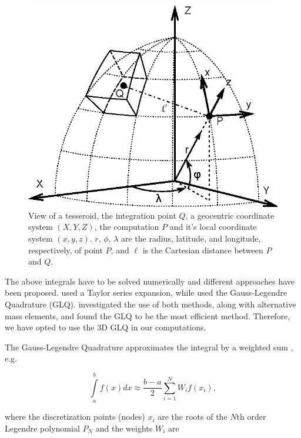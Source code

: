 \documentclass[extra]{gji}
\begin{document}
\begin{figure}
    \centering
    \includegraphics[width=\columnwidth]{figs/tesseroid}
    \caption{
        View of a tesseroid,
        the integration point $Q$,
        a geocentric coordinate system $(X, Y, Z)$,
        the computation $P$ and it's local coordinate system $(x, y, z)$.
        $r$, $\phi$, $\lambda$ are
        the radius, latitude, and longitude, respectively, of point $P$,
        and $\ell$ is the Cartesian distance between $P$ and $Q$.
    }
    \label{fig:tesseroid}
\end{figure}

The above integrals
have to be solved numerically
\citep{Wild-Pfeiffer2008}
and different approaches have been proposed.
\citet{Heck2007}
used a Taylor series expansion,
while \citet{Asgharzadeh2007}
used the Gauss-Legendre Quadrature (GLQ).
\citet{Wild-Pfeiffer2008} investigated
the use of both methods,
along with alternative mass elements,
and found the GLQ to be the most efficient method.
Therefore, we have opted to use
the 3D GLQ in our computations.

The Gauss-Legendre Quadrature
approximates the integral by
a weighted sum
\citep{Hildebrand1987},
e.g.

\begin{equation}
    \int\limits_a^b f(x) dx \approx
    \frac{b-a}{2}\sum\limits_{i=1}^N W_i f(x_i),
\end{equation}

\noindent
where the discretization points (nodes) $x_i$
are the roots of the $N$th order Legendre polynomial $P_N$
and the weights $W_i$ are \citep{Hildebrand1987}
\end{document}
